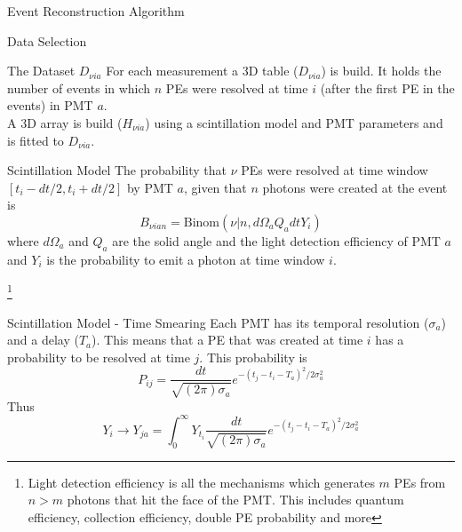 \documentclass{beamer}
\newcommand\blfootnote[1]{%
  \begingroup
  \renewcommand\thefootnote{}\footnote{#1}%
  \addtocounter{footnote}{-1}%
  \endgroup
}
\begin{document}
\begin{frame}{Event Reconstruction Algorithm}

\end{frame}

\begin{frame}{Data Selection}

\end{frame}

\begin{frame}{The Dataset $D_{\nu ia}$}
For each measurement a 3D table ($D_{\nu ia}$) is build. It holds the number of events in which $n$ PEs were resolved at time $i$ (after the first PE in the events) in PMT $a$.\\

A 3D array is build ($H_{\nu ia}$) using a scintillation model and PMT parameters and is fitted to $D_{\nu ia}$.
\end{frame}


\begin{frame}{Scintillation Model}
The probability that $\nu$ PEs were resolved at time window $[t_i-dt/2, t_i+dt/2]$ by PMT $a$, given that $n$ photons were created at the event is
\begin{equation}
B_{\nu ian}=\text{Binom}(\nu|n,d\Omega_aQ_adtY_{i})
\end{equation}
where $d\Omega_a$ and $Q_a$ are the solid angle and the light detection efficiency of PMT $a$ and $Y_i$ is the probability to emit a photon at time window $i$.

\blfootnote{Light detection efficiency is all the mechanisms which generates $m$ PEs from $n>m$ photons that hit the face of the PMT. This includes quantum efficiency, collection efficiency, double PE probability and more}
\end{frame}

\begin{frame}{Scintillation Model - Time Smearing}
Each PMT has its temporal resolution ($\sigma_a$) and a delay ($T_a$).
This means that a PE that was created at time $i$ has a probability to be resolved at time $j$. This probability is
\begin{equation}
P_{ij}=\frac{dt}{\sqrt{(2\pi)\sigma_a}}e^{-(t_j-t_i-T_a)^2/2\sigma_a^2}
\end{equation}
Thus
\begin{equation}
Y_i\rightarrow Y_{ja}=\int_0^{\infty}Y_{t_i}\frac{dt}{\sqrt{(2\pi)\sigma_a}}e^{-(t_j-t_i-T_a)^2/2\sigma_a^2}
\end{equation}

\end{frame}
\end{document}
